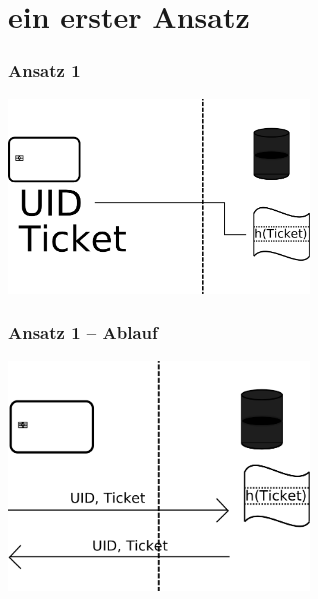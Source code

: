 \section{ein erster Ansatz}
\begin{frame}
	\frametitle{Ansatz 1}
	\begin{center}
		\includegraphics[width=8cm]{ansatz1.png}
	\end{center}
\end{frame}

\begin{frame}
	\frametitle{Ansatz 1 -- Ablauf}
	\begin{center}
		\includegraphics[width=8cm]{ansatz1ablauf.png}
	\end{center}
\end{frame}

